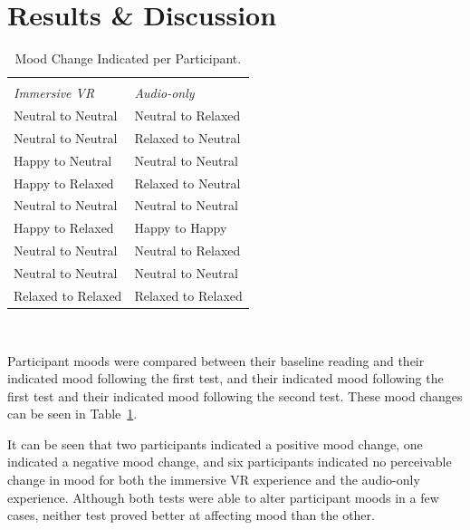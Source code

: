 \documentclass{sigchi}
\begin{document}
\section{Results \& Discussion}


\begin{table}[htb]
  \centering
  \begin{tabular}{l l}
    \toprule\\
    {\textit{Immersive VR}} & {\textit{Audio-only}}\\
    \midrule
    {Neutral to Neutral} & {Neutral to Relaxed} \\
    Neutral to Neutral & Relaxed to Neutral \\
    Happy to Neutral & Neutral to Neutral \\
    Happy to Relaxed & Relaxed to Neutral \\
    Neutral to Neutral & Neutral to Neutral \\
    Happy to Relaxed & Happy to Happy \\
    Neutral to Neutral & Neutral to Relaxed \\
    Neutral to Neutral & Neutral to Neutral \\
    Relaxed to Relaxed & Relaxed to Relaxed \\
     \bottomrule
  \end{tabular}
  \caption{Mood Change Indicated per Participant.}~\label{tab:mood_change}
\end{table}

Participant moods were compared between their baseline reading and their indicated mood following the first test, and their indicated mood following the first test and their indicated mood following the second test. These mood changes can be seen in Table~\ref{tab:mood_change}. 

It can be seen that two participants indicated a positive mood change, one indicated a negative mood change, and six participants indicated no perceivable change in mood for both the immersive VR experience and the audio-only experience. Although both tests were able to alter participant moods in a few cases, neither test proved better at affecting mood than the other.
\end{document}
